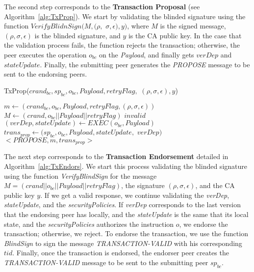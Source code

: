 \documentclass[conference]{llncs}
\begin{document}
The second step corresponds to the \textbf{Transaction Proposal} (see
Algorithm~\ref{alg:TxProp}). We start by validating
the blinded signature using the function $VerifyBlidnSign(M,(\rho,$ $\sigma,\epsilon),y)$, where $M$ is the signed message, $(\rho,\sigma,\epsilon)$ is the blinded signature, and $y$ is the CA public key. In the case that the validation process fails, the function rejects the transaction; otherwise, the peer executes the operation $o_{bc}$ on the \textit{Payload}, and finally gets $verDep$ and $stateUpdate$. Finally, the submitting peer generates the \textit{PROPOSE} message to be sent to the endorsing peers.

\begin{algorithm}[ht]
\caption{TxProp($crand_{bc},sp_{bc},o_{bc},Payload,retryFlag,$ $(\rho,\sigma,\epsilon),y$)}
\label{alg:TxProp}
\begin{algorithmic}[1]
\STATE $m \gets (crand_{bc},o_{bc},Payload,retryFlag,(\rho,\sigma,\epsilon))$
\STATE $M \gets (crand,o_{bc}||Payload||retryFlag)$
  \RETURN $invalid$ \ELSE
\STATE $(verDep,stateUpdate) \gets EXEC(o_{{bc}},Payload)$ 
\STATE $trans_{prop} \gets (sp_{bc},o_{bc},Payload,stateUpdate,$ $verDep)$
\RETURN $<\textit{PROPOSE},m,trans_{prop}>$
\ENDIF
\end{algorithmic}
\end{algorithm}

The next step corresponds to the \textbf{Transaction Endorsement} detailed in Algorithm~\ref{alg:TxEndors}. We start this process validating the blinded signature using the function \textit{VerifyBlindSign} for the message $M=(crand\vert\vert o_{bc} \vert\vert Payload \vert\vert retryFlag)$, the signature $(\rho,\sigma,\epsilon)$, and the CA public key $y$. If we get a valid response, we continue validating the \textit{verDep}, \textit{stateUpdate}, and the \textit{securityPolicies}. If \textit{verDep} corresponds to the last version that the endorsing peer has locally, and the \textit{stateUpdate} is the same that its local state, and the \textit{securityPolicies} authorizes the instruction $o$, we endorse the transaction; otherwise, we reject. To endorse the transaction, we use the function \textit{BlindSign} to sign the message \textit{TRANSACTION-VALID} with his corresponding $tid$. Finally, once the transaction is endorsed, the endorser peer creates the \textit{TRANSACTION-VALID} message to be sent to the submitting peer $sp_{bc}$.
\end{document}
